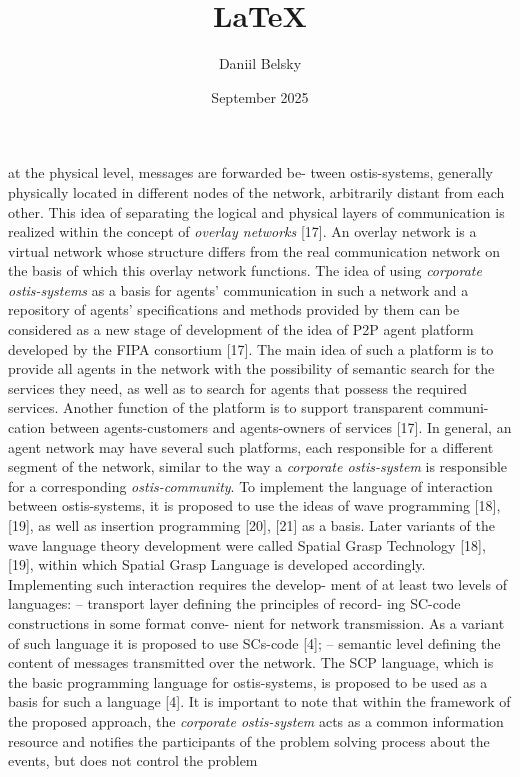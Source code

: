 \documentclass{article}
\title{LaTeX}
\author{Daniil Belsky}
\date{September 2025}
\begin{document}
\maketitle
at the physical level, messages are forwarded be-
tween ostis-systems, generally physically located in
different nodes of the network, arbitrarily distant
from each other. This idea of separating the logical
and physical layers of communication is realized
within the concept of \textit{overlay networks} [17]. An overlay network is a virtual network whose structure
differs from the real communication network on
the basis of which this overlay network functions.
The idea of using \textit{corporate ostis-systems} as a basis for agents’ communication in such a network and
a repository of agents’ specifications and methods
provided by them can be considered as a new stage
of development of the idea of P2P agent platform
developed by the FIPA consortium [17]. The main
idea of such a platform is to provide all agents in the
network with the possibility of semantic search for
the services they need, as well as to search for agents
that possess the required services. Another function
of the platform is to support transparent communi-
cation between agents-customers and agents-owners
of services [17]. In general, an agent network may
have several such platforms, each responsible for
a different segment of the network, similar to the
way a \textit{corporate ostis-system} is responsible for a corresponding \textit{ostis-community}.
To implement the language of interaction between
ostis-systems, it is proposed to use the ideas of
wave programming [18], [19], as well as insertion
programming [20], [21] as a basis. Later variants of
the wave language theory development were called
Spatial Grasp Technology [18], [19], within which
Spatial Grasp Language is developed accordingly.
Implementing such interaction requires the develop-
ment of at least two levels of languages:
– transport layer defining the principles of record-
  ing SC-code constructions in some format conve-
  nient for network transmission. As a variant of
  such language it is proposed to use SCs-code [4];
– semantic level defining the content of messages
  transmitted over the network. The SCP language,
  which is the basic programming language for
  ostis-systems, is proposed to be used as a basis
  for such a language [4].
It is important to note that within the framework of
the proposed approach, the \textit{corporate ostis-system} acts as a common information resource and notifies the participants of the problem solving process about the events, but does not control the problem
\end{document}
